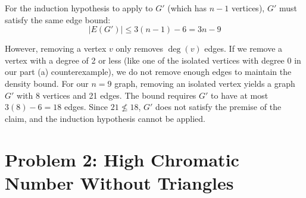 \documentclass[11pt]{article}
\begin{document}
\begin{enumerate}[label=\textbf{(\alph*)}]
    For the induction hypothesis to apply to $G'$ (which has $n-1$ vertices), $G'$ must satisfy the same edge bound:
    $$|E(G')| \le 3(n-1) - 6 = 3n - 9$$
    
    However, removing a vertex $v$ only removes $\deg(v)$ edges. If we remove a vertex with a degree of 2 or less (like one of the isolated vertices with degree 0 in our part (a) counterexample), we do not remove enough edges to maintain the density bound. For our $n=9$ graph, removing an isolated vertex yields a graph $G'$ with 8 vertices and 21 edges. The bound requires $G'$ to have at most $3(8) - 6 = 18$ edges. Since $21 \not\le 18$, $G'$ does not satisfy the premise of the claim, and the induction hypothesis cannot be applied.
\end{enumerate}

\section*{Problem 2: High Chromatic Number Without Triangles}
\end{document}
